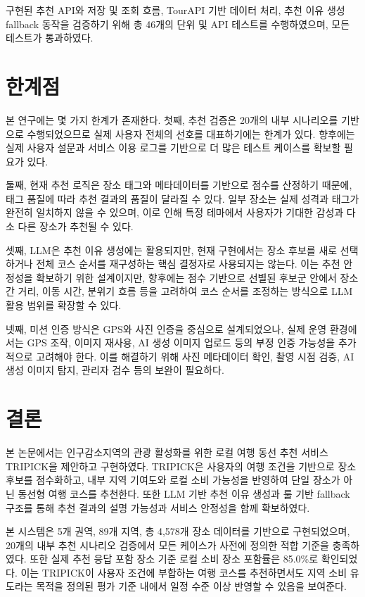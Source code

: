 \documentclass[10pt,a4paper]{article}
\begin{document}
구현된 추천 API와 저장 및 조회 흐름, TourAPI 기반 데이터 처리, 추천 이유 생성 fallback 동작을 검증하기 위해 총 46개의 단위 및 API 테스트를 수행하였으며, 모든 테스트가 통과하였다.

\section{한계점}

본 연구에는 몇 가지 한계가 존재한다. 첫째, 추천 검증은 20개의 내부 시나리오를 기반으로 수행되었으므로 실제 사용자 전체의 선호를 대표하기에는 한계가 있다. 향후에는 실제 사용자 설문과 서비스 이용 로그를 기반으로 더 많은 테스트 케이스를 확보할 필요가 있다.

둘째, 현재 추천 로직은 장소 태그와 메타데이터를 기반으로 점수를 산정하기 때문에, 태그 품질에 따라 추천 결과의 품질이 달라질 수 있다. 일부 장소는 실제 성격과 태그가 완전히 일치하지 않을 수 있으며, 이로 인해 특정 테마에서 사용자가 기대한 감성과 다소 다른 장소가 추천될 수 있다.

셋째, LLM은 추천 이유 생성에는 활용되지만, 현재 구현에서는 장소 후보를 새로 선택하거나 전체 코스 순서를 재구성하는 핵심 결정자로 사용되지는 않는다. 이는 추천 안정성을 확보하기 위한 설계이지만, 향후에는 점수 기반으로 선별된 후보군 안에서 장소 간 거리, 이동 시간, 분위기 흐름 등을 고려하여 코스 순서를 조정하는 방식으로 LLM 활용 범위를 확장할 수 있다.

넷째, 미션 인증 방식은 GPS와 사진 인증을 중심으로 설계되었으나, 실제 운영 환경에서는 GPS 조작, 이미지 재사용, AI 생성 이미지 업로드 등의 부정 인증 가능성을 추가적으로 고려해야 한다. 이를 해결하기 위해 사진 메타데이터 확인, 촬영 시점 검증, AI 생성 이미지 탐지, 관리자 검수 등의 보완이 필요하다.

\section{결론}

본 논문에서는 인구감소지역의 관광 활성화를 위한 로컬 여행 동선 추천 서비스 TRIPICK을 제안하고 구현하였다. TRIPICK은 사용자의 여행 조건을 기반으로 장소 후보를 점수화하고, 내부 지역 기여도와 로컬 소비 가능성을 반영하여 단일 장소가 아닌 동선형 여행 코스를 추천한다. 또한 LLM 기반 추천 이유 생성과 룰 기반 fallback 구조를 통해 추천 결과의 설명 가능성과 서비스 안정성을 함께 확보하였다.

본 시스템은 5개 권역, 89개 지역, 총 4,578개 장소 데이터를 기반으로 구현되었으며, 20개의 내부 추천 시나리오 검증에서 모든 케이스가 사전에 정의한 적합 기준을 충족하였다. 또한 실제 추천 응답 포함 장소 기준 로컬 소비 장소 포함률은 85.0\%로 확인되었다. 이는 TRIPICK이 사용자 조건에 부합하는 여행 코스를 추천하면서도 지역 소비 유도라는 목적을 정의된 평가 기준 내에서 일정 수준 이상 반영할 수 있음을 보여준다.
\end{document}
